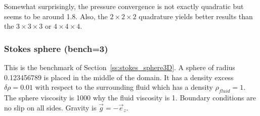 Somewhat surprisingly, the pressure convergence is not exactly quadratic but seems to be
around 1.8. Also, the $2\times 2\times 2$ 
quadrature yields better results than the $3\times 3\times 3$ or $4\times 4 \times 4$.

\subsubsection*{Stokes sphere (bench=3)}

This is the benchmark of Section~\ref{ss:stokes_sphere3D}.
A sphere of radius 0.123456789 is placed in the middle of the domain. 
It has a density excess $\delta\rho=0.01$
with respect to the surrounding fluid which has a density $\rho_{fluid}=1$. 
The sphere viscosity is 1000 why the fluid viscosity is 1.
Boundary conditions are no slip on all sides. Gravity is $\vec{g}=-\vec{e}_z$.


